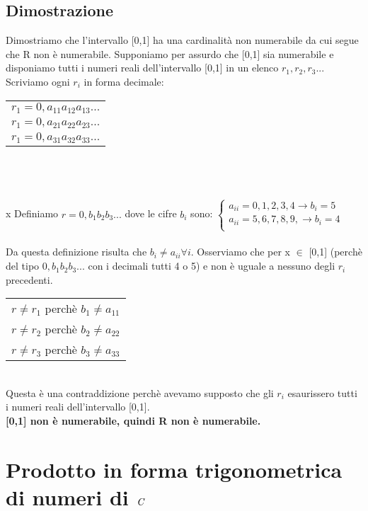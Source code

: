 \documentclass[11pt, a4paper]{book}
\begin{document}
\subsection*{Dimostrazione}
Dimostriamo che l'intervallo [0,1] ha una cardinalità non numerabile da cui segue che R non è numerabile. Supponiamo per assurdo che [0,1] sia numerabile e disponiamo tutti i numeri reali dell'intervallo [0,1] in un elenco $r_1, r_2,r_3...$\\ Scriviamo ogni $r_i$ in forma decimale:
\begin{tabular}{c}
\begin{math} r_1=0,a_{11} a_{12} a_{13} ... \end{math}\\
\begin{math} r_1=0,a_{21} a_{22} a_{23} ... \end{math}\\
\begin{math} r_1=0,a_{31} a_{32} a_{33} ... \end{math}
\end{tabular}
\\
\\
\\x
Definiamo $r=0,b_1 b_2 b_3 ...$ dove le cifre $b_i$ sono: 
$
\left \{
\begin{array}{l}
a_{ii}=0,1,2,3,4 \rightarrow b_i=5\\
a_{ii}=5,6,7,8,9, \rightarrow b_i=4\\
\end{array}
\right.
$
\\	\\
Da questa definizione risulta che $b_i \neq a_{ii} \forall i$. Osserviamo che per x $\in$ [0,1] (perchè del tipo $ 0,b_1 b_2 b_3 ...$ con i decimali tutti 4 o 5) e non è uguale a nessuno degli $r_i$ precedenti.
\\
\begin{tabular}{l}
$r \neq r_1$ perchè $b_1 \neq a_{11}$\\
$r \neq r_2$ perchè $b_2 \neq a_{22}$\\
$r \neq r_3$ perchè $b_3 \neq a_{33}$
\end{tabular}
\\
Questa è una contraddizione perchè avevamo supposto che gli $r_i$ esaurissero tutti i numeri reali dell'intervallo [0,1].
\\
\textbf{[0,1] non è numerabile, quindi R non è numerabile.}

\section{Prodotto in forma trigonometrica di numeri di $\emph{C}$}
\end{document}
